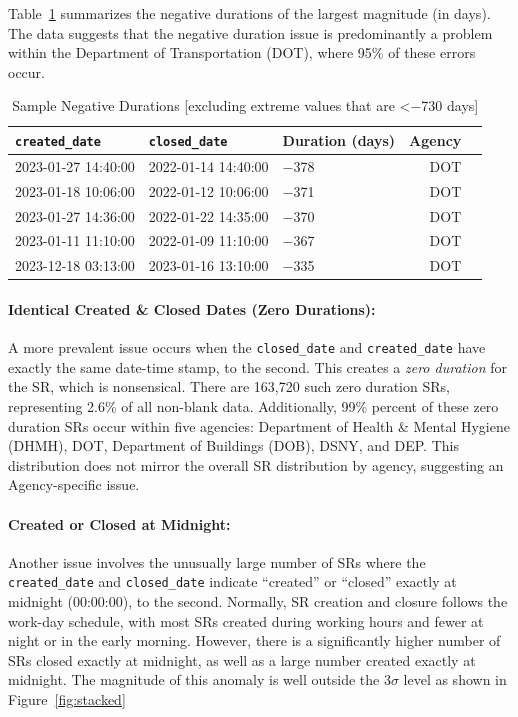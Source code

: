 \documentclass[linenumber]{jdsart}
\begin{document}
Table~\ref{tab:largest-errors} summarizes the 
negative durations of the largest magnitude (in days). The data 
suggests that the negative duration issue is predominantly a problem 
within the Department of Transportation (DOT), where 95\% of these 
errors occur.

\begin{table}[tbp]
  \centering
  \caption{Sample  Negative Durations [excluding extreme values that are <$-$730 days]}
   \label{tab:largest-errors}
 	\begin{tabular}{l l l r l}
    \toprule
    \texttt{created\_date} & \texttt{closed\_date} & {Duration (days)}  & {Agency} \\
    \midrule
    2023-01-27 14:40:00 & 2022-01-14 14:40:00 & $-$378 & DOT \\
    2023-01-18 10:06:00 & 2022-01-12 10:06:00 & $-$371 & DOT \\
    2023-01-27 14:36:00 & 2022-01-22 14:35:00 & $-$370 & DOT \\
    2023-01-11 11:10:00 & 2022-01-09 11:10:00 & $-$367 & DOT \\
    2023-12-18 03:13:00 & 2023-01-16 13:10:00 & $-$335 & DOT \\
    \bottomrule
    \end{tabular}
 \end{table}

\paragraph{Identical Created \& Closed Dates (Zero Durations):}
A more prevalent issue occurs when the \texttt{closed\_date} and 
\texttt{created\_date} have exactly the same date-time stamp, 
to the second. This creates a \emph{zero duration} for the 
SR, which is nonsensical. There are 163,720 such zero duration 
SRs, representing 2.6\% of all non-blank data. 
Additionally, 99\% percent of these zero duration SRs 
occur within five agencies: Department of Health \& Mental 
Hygiene (DHMH), DOT, Department of Buildings (DOB), DSNY, and 
DEP. This distribution does not mirror the overall SR 
distribution by agency, suggesting an Agency-specific issue.
	
\paragraph{Created or Closed at Midnight:}
Another issue involves the unusually large number of 
SRs where the \texttt{created\_date} and \texttt{closed\_date} 
indicate ``created'' or ``closed'' exactly at midnight (00:00:00), 
to the second. Normally, SR creation and closure follows 
the work-day schedule, with most SRs created 
during working hours and fewer at night or in the 
early morning. However, there is a significantly higher 
number of SRs closed exactly at midnight, as well 
as a large number created exactly at midnight. The magnitude 
of this anomaly is well outside the 3$\sigma$ level as shown 
in Figure~\ref{fig:stacked}
\end{document}
